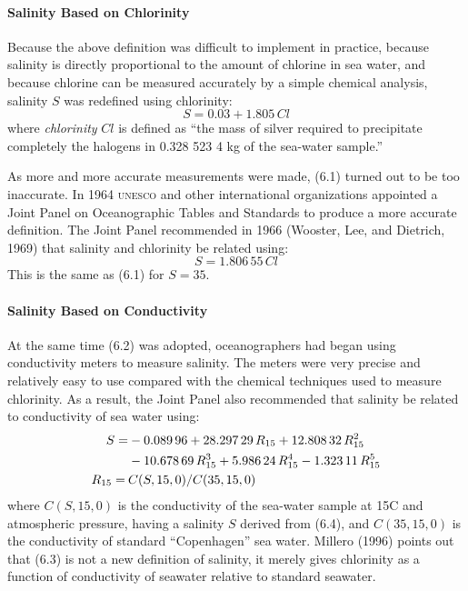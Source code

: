 \paragraph{Salinity Based on Chlorinity}
Because the above definition was difficult to implement in practice, because salinity is directly
proportional to the amount of chlorine in sea water, and because
chlorine can be measured accurately by a simple chemical analysis,
salinity $S$ was redefined using chlorinity:
\begin{equation}
S = 0.03 + 1.805\, Cl
\end{equation}
where \textit{chlorinity} $Cl$ is defined as
``the mass of silver required to precipitate completely the halogens
in 0.328 523 4 kg of the sea-water sample.''

As more and more accurate measurements were made, (6.1) turned out to
be too inaccurate. In 1964 \textsc{unesco} and other international
organizations appointed a Joint Panel on Oceanographic Tables and
Standards to produce a more accurate definition. The Joint Panel
recommended in 1966 (Wooster, Lee, and Dietrich, 1969) that salinity
and chlorinity be related using:
\begin{equation}
S = 1.806\,55\,Cl
\end{equation}
This is the same as (6.1) for $S=35$.

\paragraph{Salinity Based on Conductivity}
At the same time (6.2) was adopted, ocean\-ographers had began using conductivity
meters to measure salinity. The meters were very precise and
relatively easy to use compared with the chemical techniques used to
measure chlorinity. As a result, the Joint Panel also recommended that
salinity be related to conductivity of sea water
using:
\begin{subequations}
\begin{align}
S  = &-0.089\,96 + 28.297\,29\,R_{15} + 12.808\,32\,R^2_{15} \notag \\
&-10.678\,69\,R^3_{15} + 5.986\,24\,R^4_{15} - 1.323\,11\,R^5_{15} \\
R_{15} = \: &C(S,15,0)/C(35,15,0)
\end{align}
\end{subequations}
where $C(S, 15, 0)$ is the conductivity of the sea-water sample at
15\degrees C and atmospheric pressure, having a salinity $S$ derived
from (6.4), and $C(35, 15, 0)$ is the conductivity of standard
``Copenhagen'' sea water. Millero (1996)
points out that (6.3) is not a new definition of salinity, it merely
gives chlorinity as a function of conductivity of seawater relative to
standard seawater.

